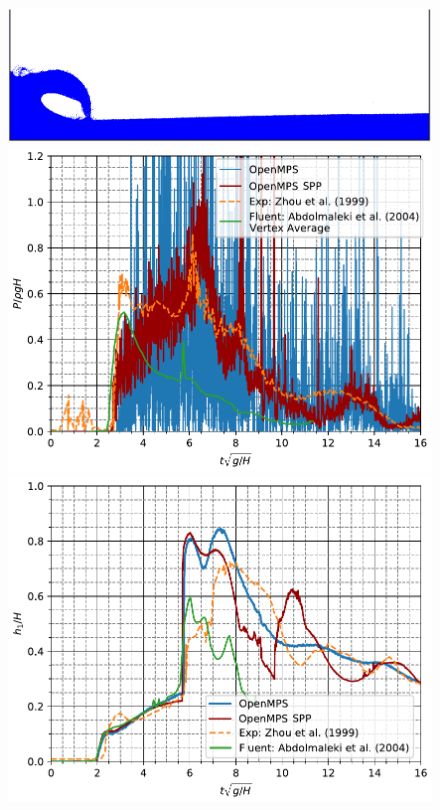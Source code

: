 		\begin{figure} \centering
			\begin{minipage}{.7 \linewidth} \centering
				\includegraphics[clip, width=\linewidth]{img/dambreak2_snap.png}
			\end{minipage}
			\begin{minipage}{.3 \linewidth} \centering
				\includegraphics[clip, width=\linewidth]{img/zhouetal1999_p2_2mm.pdf}
			\end{minipage}
			\begin{minipage}{.3 \linewidth} \centering
				\includegraphics[clip, width=\linewidth]{img/zhouetal1999_h1_2mm.pdf}

\end{minipage}
\end{figure}
